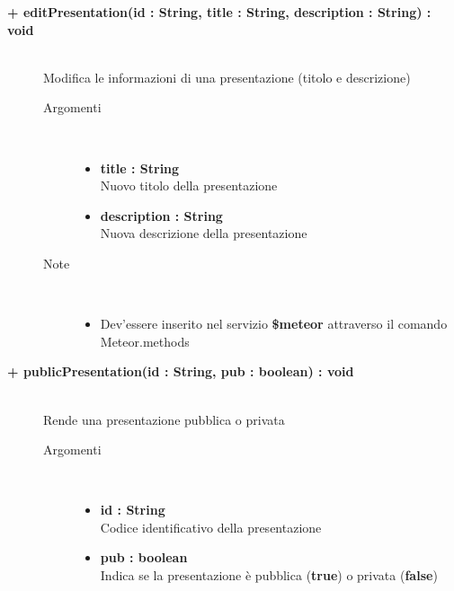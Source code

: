 \begin{description}
	\begin{description}
		\item[\textbf{\color{blue}+ editPresentation(id : String, title : String, description : String) : void			}] \hfill \\
			Modifica le informazioni di una presentazione (titolo e descrizione)
			
		\begin{description}
			\item[Argomenti] \hfill \\
				\begin{itemize}
				
					\item \textbf{title : String			} \hfill \\
					Nuovo titolo della presentazione
					\item \textbf{description : String			} \hfill \\
					Nuova descrizione della presentazione
					
				\end{itemize}
			\item[Note] \hfill \\
			\begin{itemize}
					\item Dev'essere inserito nel servizio \textbf{\$meteor} attraverso il comando Meteor.methods
				\end{itemize}
		\end{description}
	\end{description}

	\begin{description}
		\item[\textbf{\color{blue}+ publicPresentation(id : String, pub : boolean) : void			}] \hfill \\
			Rende una presentazione pubblica o privata
			
		\begin{description}
			\item[Argomenti] \hfill \\
				\begin{itemize}
				
					\item \textbf{id :  String			} \hfill \\
					Codice identificativo della presentazione
					\item \textbf{pub :  boolean			} \hfill \\
					Indica se la presentazione è pubblica (\textbf{true}) o privata (\textbf{false})
					

\end{itemize}
\end{description}
\end{description}
\end{description}
